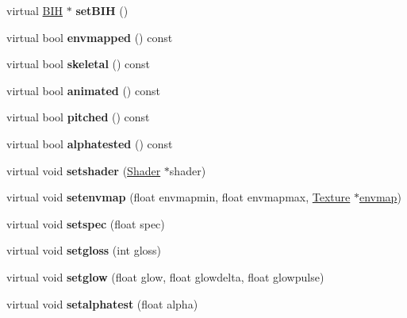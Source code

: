 \begin{DoxyCompactItemize}
virtual \hyperlink{struct_b_i_h}{B\+IH} $\ast$ {\bfseries set\+B\+IH} ()
\item 
\mbox{\label{structmodel_a9d49529c481f7c1b71fa3b4cf85c7e5b}} 
virtual bool {\bfseries envmapped} () const
\item 
\mbox{\label{structmodel_a5393e41753b1b6aa172e99a8edaf85e3}} 
virtual bool {\bfseries skeletal} () const
\item 
\mbox{\label{structmodel_a7b9f0e66ad0d7fc8b3372c9e8992b11b}} 
virtual bool {\bfseries animated} () const
\item 
\mbox{\label{structmodel_a537f58848b3120c5dfec710c6f81b124}} 
virtual bool {\bfseries pitched} () const
\item 
\mbox{\label{structmodel_a4d33f3c4bfb6cf8376c400654755d793}} 
virtual bool {\bfseries alphatested} () const
\item 
\mbox{\label{structmodel_a335924808b6065ec748fcbc23664ac0e}} 
virtual void {\bfseries setshader} (\hyperlink{struct_shader}{Shader} $\ast$shader)
\item 
\mbox{\label{structmodel_a9e555488507c6084644de6def1c1c563}} 
virtual void {\bfseries setenvmap} (float envmapmin, float envmapmax, \hyperlink{struct_texture}{Texture} $\ast$\hyperlink{structenvmap}{envmap})
\item 
\mbox{\label{structmodel_a030dcd266c898b22827e2a60880ad644}} 
virtual void {\bfseries setspec} (float spec)
\item 
\mbox{\label{structmodel_ad1ebc6953d954c8935664faf0f437276}} 
virtual void {\bfseries setgloss} (int gloss)
\item 
\mbox{\label{structmodel_a89eab0505e74c54bd37253bbe4c45e26}} 
virtual void {\bfseries setglow} (float glow, float glowdelta, float glowpulse)
\item 
\mbox{\label{structmodel_a62b2baa83f383527e900b606f501b110}} 
virtual void {\bfseries setalphatest} (float alpha)
\item 

\end{DoxyCompactItemize}
